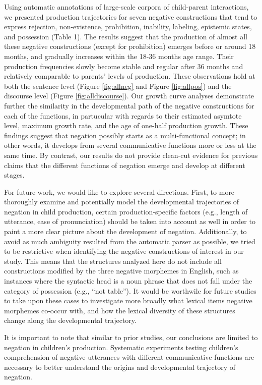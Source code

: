 \documentclass[
  english,
  man,floatsintext]{apa6}
\begin{document}
Using automatic annotations of large-scale corpora of child-parent interactions, we presented production trajectories for seven negative constructions that tend to express rejection, non-existence, prohibition, inability, labeling, epistemic states, and possession (Table 1). The results suggest that the production of almost all these negative constructions (except for prohibition) emerges before or around 18 months, and gradually increases within the 18-36 months age range. Their production frequencies slowly become stable and regular after 36 months and relatively comparable to parents' levels of production. These observations hold at both the sentence level (Figure \ref{fig:allneg} and Figure \ref{fig:allpos}) and the discourse level (Figure \ref{fig:alldiscourse}). Our growth curve analyses demonstrate further the similarity in the developmental path of the negative constructions for each of the functions, in partucular with regards to their estimated asymtote level, maximum growth rate, and the age of one-half production growth. These findings suggest that negation possibly starts as a multi-functional concept; in other words, it develops from several communicative functions more or less at the same time. By contrast, our results do not provide clean-cut evidence for previous claims that the different functions of negation emerge and develop at different stages.

For future work, we would like to explore several directions. First, to more thoroughly examine and potentially model the developmental trajectories of negation in child production, certain production-specific factors (e.g., length of utterance, ease of pronunciation) should be taken into account as well in order to paint a more clear picture about the development of negation. Additionally, to avoid as much ambiguity resulted from the automatic parser as possible, we tried to be restrictive when identifying the negative constructions of interest in our study. This means that the structures analyzed here do not include all constructions modified by the three negative morphemes in English, such as instances where the syntactic head is a noun phrase that does not fall under the category of possession (e.g., ``not table''). It would be worthwile for future studies to take upon these cases to investigate more broadly what lexical items negative morphemes co-occur with, and how the lexical diversity of these structures change along the developmental trajectory.

It is important to note that similar to prior studies, our conclusions are limited to negation in children's production. Systematic experiments testing children's comprehension of negative utterances with different communicative functions are necessary to better understand the origins and developmental trajectory of negation.
\end{document}
